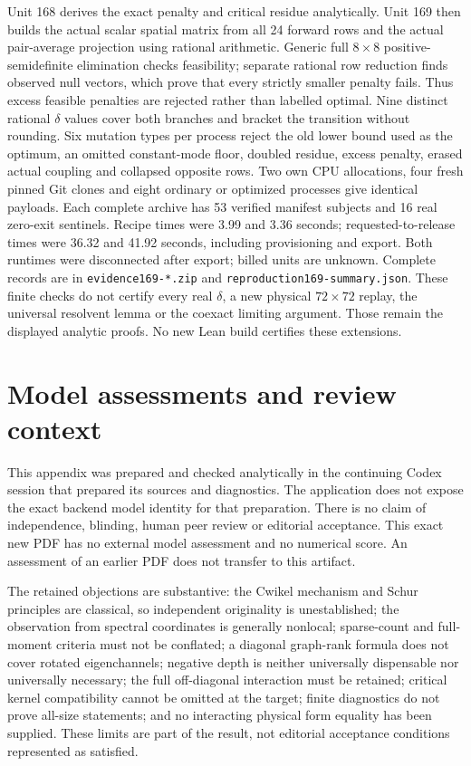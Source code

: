 \documentclass[11pt,a4paper]{article}
\begin{document}
Unit 168 derives the exact penalty and critical residue analytically.
Unit 169 then builds the actual scalar spatial matrix from all 24 forward
rows and the actual pair-average projection using rational arithmetic.
Generic full $8\times8$ positive-semidefinite elimination checks feasibility;
separate rational row reduction finds observed null vectors, which prove
that every strictly smaller penalty fails. Thus excess feasible penalties
are rejected rather than labelled optimal. Nine distinct rational
$\delta$ values cover both branches and bracket the transition without
rounding. Six mutation types per process reject the old lower bound used
as the optimum, an omitted constant-mode floor, doubled residue, excess
penalty, erased actual coupling and collapsed opposite rows.
Two own CPU allocations, four fresh pinned Git clones and eight ordinary
or optimized processes give identical payloads. Each complete archive has
53 verified manifest subjects and 16 real zero-exit sentinels. Recipe times
were 3.99 and 3.36 seconds; requested-to-release times were 36.32 and
41.92 seconds, including provisioning and export. Both runtimes were
disconnected after export; billed units are unknown. Complete records are
in \texttt{evidence169-*.zip} and \texttt{reproduction169-summary.json}.
These finite checks do not certify every real $\delta$, a new physical
$72\times72$ replay, the universal resolvent lemma or the coexact limiting
argument. Those remain the displayed analytic proofs. No new Lean build
certifies these extensions.

\section{Model assessments and review context}
This appendix was prepared and checked analytically in the continuing Codex
session that prepared its sources and diagnostics. The application does not
expose the exact backend model identity for that preparation. There is no
claim of independence, blinding, human peer review or editorial acceptance.
This exact new PDF has no external model assessment and no numerical score.
An assessment of an earlier PDF does not transfer to this artifact.

The retained objections are substantive: the Cwikel mechanism and Schur
principles are classical, so independent originality is unestablished; the
observation from spectral coordinates is generally nonlocal; sparse-count
and full-moment criteria must not be conflated; a diagonal graph-rank formula
does not cover rotated eigenchannels; negative depth is neither universally
dispensable nor universally necessary; the full off-diagonal interaction must
be retained; critical kernel compatibility cannot be omitted at the target; finite diagnostics do not prove all-size statements; and no
interacting physical form equality has been supplied. These limits are part
of the result, not editorial acceptance conditions represented as satisfied.
\end{document}
